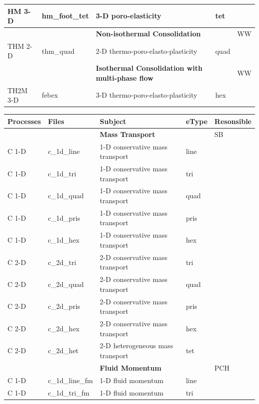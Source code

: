 \begin{center}
\begin{tabular*}{12.7cm}{|p{1.5cm}|p{1.8cm}|p{4.78cm}|p{1cm}|p{1.5cm}|}
HM 3-D     & hm\_foot\_tet & 3-D poro-elasticity & tet &  \\
\hline
           &             & \textbf{Non-isothermal Consolidation} & & WW \\
THM 2-D    & thm\_quad & 2-D thermo-poro-elasto-plasticity & quad &  \\
\hline
           &             & \textbf{Isothermal Consolidation with multi-phase flow} & & WW \\
TH2M 3-D    & febex & 3-D thermo-poro-elasto-plasticity & hex &  \\
\hline
\end{tabular*}
\end{center}

\begin{center}
\begin{tabular*}{12.7cm}{|p{1.5cm}|p{1.8cm}|p{4.78cm}|p{1cm}|p{1.5cm}|} \hline
Processes & Files & Subject                & eType & Resonsible \\
\hline \hline
           &             & \textbf{Mass Transport} & & SB \\
C 1-D      & c\_1d\_line  & 1-D conservative mass transport & line &  \\
C 1-D      & c\_1d\_tri   & 1-D conservative mass transport & tri &  \\
C 1-D      & c\_1d\_quad  & 1-D conservative mass transport & quad &  \\
C 1-D      & c\_1d\_pris  & 1-D conservative mass transport & pris &  \\
C 1-D      & c\_1d\_hex   & 1-D conservative mass transport & hex &  \\
C 2-D      & c\_2d\_tri   & 2-D conservative mass transport & tri &  \\
C 2-D      & c\_2d\_quad  & 2-D conservative mass transport & quad &  \\
C 2-D      & c\_2d\_pris  & 2-D conservative mass transport & pris &  \\
C 2-D      & c\_2d\_hex   & 2-D conservative mass transport & hex &  \\
C 2-D      & c\_2d\_het   & 2-D heterogeneous mass transport & tet &  \\
\hline
           &             & \textbf{Fluid Momentum} & & PCH \\
C 1-D      & c\_1d\_line\_fm  & 1-D fluid momentum & line &  \\
C 1-D      & c\_1d\_tri\_fm   & 1-D fluid momentum & tri &  \\

\end{tabular*}
\end{center}
